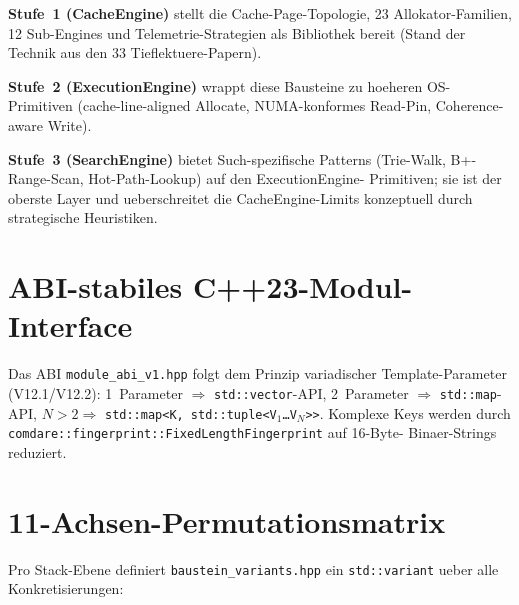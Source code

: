 \textbf{Stufe~1 (CacheEngine)} stellt die Cache-Page-Topologie, 23
Allokator-Familien, 12 Sub-Engines und Telemetrie-Strategien als
Bibliothek bereit (Stand der Technik aus den 33 Tieflektuere-Papern).

\textbf{Stufe~2 (ExecutionEngine)} wrappt diese Bausteine zu hoeheren
OS-Primitiven (cache-line-aligned Allocate, NUMA-konformes Read-Pin,
Coherence-aware Write).

\textbf{Stufe~3 (SearchEngine)} bietet Such-spezifische Patterns
(Trie-Walk, B+-Range-Scan, Hot-Path-Lookup) auf den ExecutionEngine-
Primitiven; sie ist der oberste Layer und ueberschreitet die
CacheEngine-Limits konzeptuell durch strategische Heuristiken.

\section{ABI-stabiles C++23-Modul-Interface}

Das ABI \texttt{module\_abi\_v1.hpp} folgt dem Prinzip variadischer
Template-Parameter (V12.1/V12.2): 1~Parameter $\Rightarrow$
\texttt{std::vector}-API, 2~Parameter $\Rightarrow$ \texttt{std::map}-API,
$N>2 \Rightarrow$ \texttt{std::map<K, std::tuple<V$_1$\ldots V$_N$>>}.
Komplexe Keys werden durch
\texttt{comdare::fingerprint::FixedLengthFingerprint} auf 16-Byte-
Binaer-Strings reduziert.

\section{11-Achsen-Permutationsmatrix}

Pro Stack-Ebene definiert \texttt{baustein\_variants.hpp} ein
\texttt{std::variant} ueber alle Konkretisierungen:

